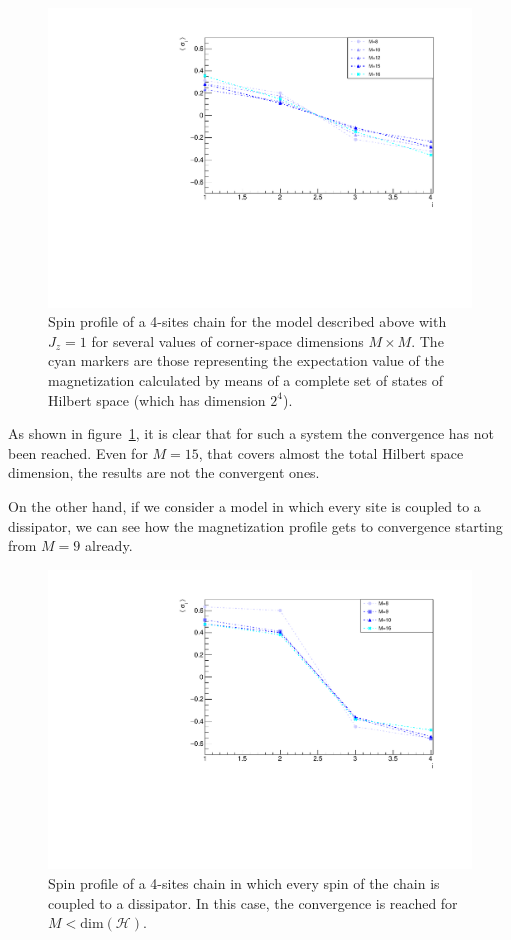 \begin{figure}[H]
    \centering
    \includegraphics[scale=0.7]{Figures/4sites/4sites_LM_convergenceIncreasingM.pdf}
    \caption{Spin profile of a 4-sites chain for the model described above with $J_z=1$ for several values of corner-space dimensions $M \times M$. The cyan markers are those representing the expectation value of the magnetization calculated by means of a complete set of states of Hilbert space (which has dimension $2^4$).}
    \label{fig:4sites_LM_convergenceIncreasingM}
\end{figure}

As shown in figure~\ref{fig:4sites_LM_convergenceIncreasingM}, it is clear that for such a system the convergence has not been reached. Even for $M = 15$, that covers almost the total Hilbert space dimension, the results are not the convergent ones.

On the other hand, if we consider a model in which every site is coupled to a dissipator, we can see how the magnetization profile gets to convergence starting from $M = 9$ already.


\begin{figure}[H]
    \centering
    \includegraphics[scale=0.7]{Figures/4sites/4sites_totalDissipators.pdf}
    \caption{Spin profile of a 4-sites chain in which every spin of the chain is coupled to a dissipator. In this case, the convergence is reached for $M<\text{dim}(\mathcal{H})$.}
    \label{fig:4sites_totalDissipators}
\end{figure}

